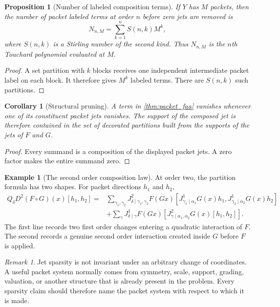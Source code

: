 \documentclass{aomart}
\newtheorem{proposition}[proposition]{Proposition}
\newtheorem{corollary}[corollary]{Corollary}
\theoremstyle{definition}
\newtheorem{example}[example]{Example}
\theoremstyle{remark}
\newtheorem{remark}[remark]{Remark}
\begin{document}
\begin{proposition}[Number of labeled composition terms]\label{prop:faa_term_count}
If $Y$ has $M$ packets, then the number of packet labeled terms at order $n$ before zero jets are removed is
\[
N_{n,M}
=
\sum_{k=1}^{n}S(n,k)M^k,
\]
where $S(n,k)$ is a Stirling number of the second kind.  Thus $N_{n,M}$ is the $n$th Touchard polynomial evaluated at $M$.
\end{proposition}

\begin{proof}
A set partition with $k$ blocks receives one independent intermediate packet label on each block.  It therefore gives $M^k$ labeled terms.  There are $S(n,k)$ such partitions.
\end{proof}

\begin{corollary}[Structural pruning]\label{cor:structural_pruning}
A term in \cref{thm:packet_faa} vanishes whenever one of its constituent packet jets vanishes.  The support of the composed jet is therefore contained in the set of decorated partitions built from the supports of the jets of $F$ and $G$.
\end{corollary}

\begin{proof}
Every summand is a composition of the displayed packet jets.  A zero factor makes the entire summand zero.
\end{proof}


\begin{example}[The second order composition law]\label{ex:second_order_composition}
At order two, the partition formula has two shapes.  For packet directions $h_1$ and $h_2$,
\[
\begin{aligned}
Q_\delta D^2(F\circ G)(x)[h_1,h_2]
={}&
\sum_{\gamma_1,\gamma_2}
J^2_{\delta\mid\gamma_1,\gamma_2}F(Gx)
[J^1_{\gamma_1\mid\alpha_1}G(x)h_1,J^1_{\gamma_2\mid\alpha_2}G(x)h_2]\\
&+
\sum_\gamma
J^1_{\delta\mid\gamma}F(Gx)
[J^2_{\gamma\mid\alpha_1,\alpha_2}G(x)[h_1,h_2]].
\end{aligned}
\]
The first line records two first order changes entering a quadratic interaction of $F$.  The second records a genuine second order interaction created inside $G$ before $F$ is applied.
\end{example}

\begin{remark}\label{rem:jet_coordinate_dependence}
Jet sparsity is not invariant under an arbitrary change of coordinates.  A useful packet system normally comes from symmetry, scale, support, grading, valuation, or another structure that is already present in the problem.  Every sparsity claim should therefore name the packet system with respect to which it is made.
\end{remark}
\end{document}
